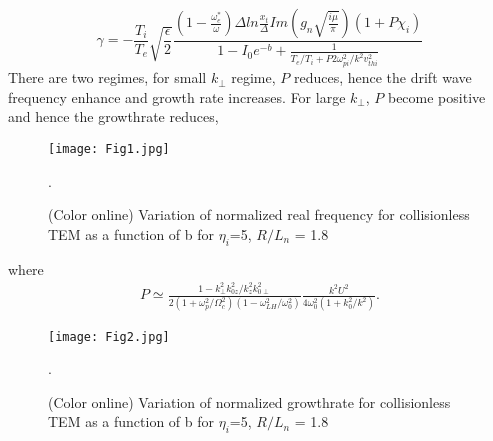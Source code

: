 \documentclass[aip,pop,amsmath,amssymb,showpacs,reprint,floatfix,lengthcheck]{revtex4-1}
\begin{document}
\begin{equation}
 \gamma=-\frac{T_{i}}{T_{e}}\sqrt{\frac{\epsilon}{2}}\frac{(1-\frac{\omega_{e}^*}{\omega})\Delta ln\frac{x_{t}}{\Delta}Im(g_{n}\sqrt{\frac{i\mu}{\pi}})(1+P\chi_{i})}{1-I_{0}e^{-b}+\frac{1}{T_{e}/T_{i}+P2\omega_{pi}^2/k^2v_{thi}^2}}
\end{equation}
There are two regimes, for small $k_{\perp}$ regime, $P$ reduces, hence the drift wave frequency enhance and growth rate increases. For large $k_{\perp}$, $P$ become positive and hence the growthrate reduces, 
\begin{figure}
 \centering
 \texttt{[image: Fig1.jpg]}
 \caption{(Color online) Variation of normalized real frequency for collisionless TEM as a function of b for $\eta_{i}$=5, $R/L_{n}$ = 1.8}.
 \label{fig:1}
\end{figure}
where
\begin{eqnarray}
 P\simeq\frac{1-k_{\perp}^2k_{0z}^2/k_{z}^2k_{0\perp}^2}{2(1+\omega_{p}^2/\Omega_{c}^2)(1-\omega_{LH}^2/\omega_{0}^2)}\frac{k^2U^2}{4\omega_{0}^2(1+k_{0}^2/k^2)}.
\end{eqnarray}
\begin{figure}
 \centering
 \texttt{[image: Fig2.jpg]}
 \caption{(Color online) Variation of normalized growthrate for collisionless TEM as a function of b for $\eta_{i}$=5, $R/L_{n}$ = 1.8}.
 \label{fig:2}
\end{figure}
 
\end{document}
